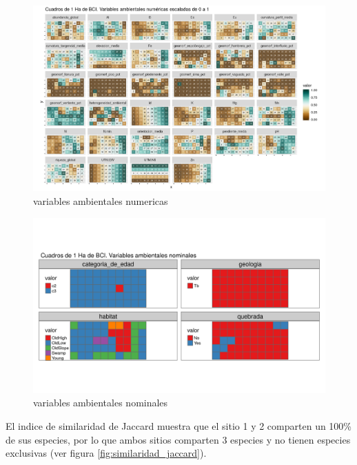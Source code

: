 \documentclass[11pt,]{article}
\begin{document}
\begin{figure}
\centering
\includegraphics[width=1.00000\textwidth]{mapas_variables_ambientales_numericas.png}
\caption{variables ambientales
numericas\label{fig:mapas_variables_ambientales_numericas}}
\end{figure}

\begin{figure}
\centering
\includegraphics{mapas_variables_ambientales_nominales_tmap.png}
\caption{variables ambientales
nominales\label{fig:mapas_variables_ambientales_nominales}}
\end{figure}

El indice de similaridad de Jaccard muestra que el sitio 1 y 2 comparten
un 100\% de sus especies, por lo que ambos sitios comparten 3 especies y
no tienen especies exclusivas (ver figura
\ref{fig:similaridad_jaccard}).
\end{document}
